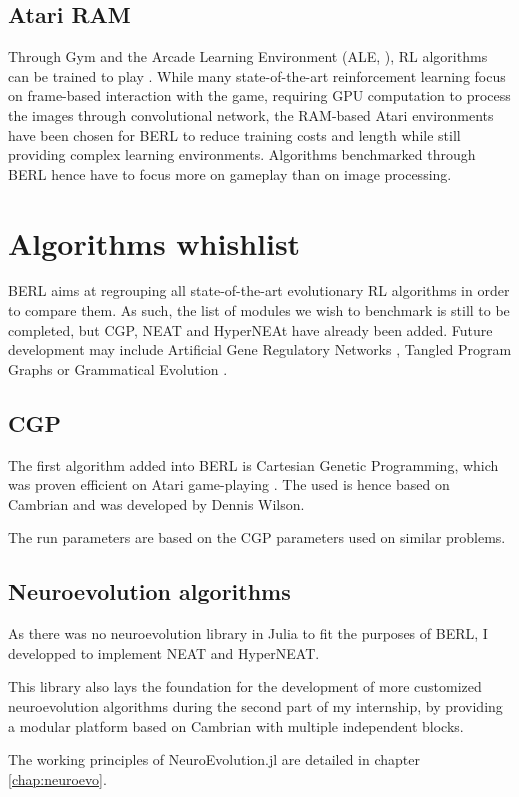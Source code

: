 \subsection{Atari RAM}

Through Gym and the Arcade Learning Environment (ALE, \cite{Atari}), RL algorithms can be trained to play . While many state-of-the-art reinforcement learning focus on frame-based interaction with the game, requiring GPU computation to process the images through convolutional network, the RAM-based Atari environments have been chosen for BERL to reduce training costs and length while still providing complex learning environments. Algorithms benchmarked through BERL hence have to focus more on gameplay than on image processing. 

\section{Algorithms whishlist}

BERL aims at regrouping all state-of-the-art evolutionary RL algorithms in order to compare them. As such, the list of modules we wish to benchmark is still to be completed, but CGP, NEAT and HyperNEAt have already been added. Future development may include Artificial Gene Regulatory Networks \cite{GRN}, Tangled Program Graphs \cite{tpg} or Grammatical Evolution \cite{grammatical-evo}.

\subsection{CGP}

The first algorithm added into BERL is Cartesian Genetic Programming, which was proven efficient on Atari game-playing \cite{CGP}. The  used is hence based on Cambrian and was developed by Dennis Wilson. 

The run parameters are based on the CGP parameters used on similar problems. 

\subsection{Neuroevolution algorithms}

As there was no neuroevolution library in Julia to fit the purposes of BERL, I developped  to implement NEAT and HyperNEAT.

This library also lays the foundation for the development of more customized neuroevolution algorithms during the second part of my internship, by providing a modular platform based on Cambrian with multiple independent blocks. 

The working principles of NeuroEvolution.jl are detailed in chapter \ref{chap:neuroevo}.

